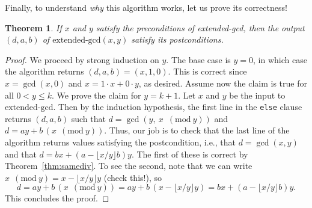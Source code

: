 \documentclass[11pt]{article}
\newcounter{thm}
\newtheorem{theorem}{Theorem}[thm]
\renewcommand{\pmod}[1]{~(\text{mod}~#1)}
\begin{document}

Finally, to understand \emph{why} this algorithm works, let us prove its correctness!

\begin{theorem}
	If $x$ and $y$ satisfy the preconditions of extended-gcd, then the output $(d,a,b)$ of $\text{extended-gcd}(x,y)$ satisfy its postconditions.
\end{theorem}
\begin{proof}
We proceed by strong induction on $y$. The base case is $y=0$, in which case the algorithm returns $(d,a,b)=(x,1,0)$. This is correct since $x=\gcd(x,0)$ and $x=1\cdot x+ 0\cdot y$, as desired. Assume now the claim is true for all $0<y\leq k$. We prove the claim for $y=k+1$. Let $x$ and $y$ be the input to $\text{extended-gcd}$. Then by the induction hypothesis, the first line in the {\tt else} clause returns $(d,a,b)$ such that $d=\gcd(y, \: x \; \pmod y)$ and $d=ay+ b \, (x \: \pmod y)$. Thus, our job is to check that the last line of the algorithm returns values satisfying the postcondition, i.e., that $d=\gcd(x,y)$ and that $d=bx+(a - \lfloor x/y\rfloor b)y$. The first of these is correct by Theorem~\ref{thm:samediv}. To see the second,  note that we can write~$x\:\pmod y = x - \lfloor x/y\rfloor y$ (check this!), so
%
\[
	d = ay+b \, (x \: \pmod y)= ay + b \, (x - \lfloor x/y\rfloor y)= bx + (a - \lfloor x/y\rfloor b) y.
\] 
This concludes the proof.
\end{proof}
\end{document}
